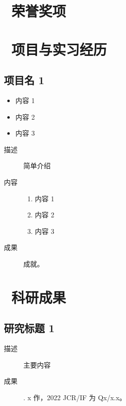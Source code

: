 \documentclass[]{resume}
\begin{document}
\section{\faAward \, 荣誉奖项}


\section{\faCode \, 项目与实习经历}

\subsection{项目名 1}

\begin{itemize}
    \item 内容 1
    \item 内容 2
    \item 内容 3
\end{itemize}


\begin{description}
    \item[描述] 简单介绍
    \item[内容]
        \begin{enumerate}
            \item 内容 1
            \item 内容 2
            \item 内容 3
        \end{enumerate}
    \item[成果] 成就。
\end{description}

\section{\aiGoogleScholar \, 科研成果}

\subsection{研究标题 1}

\begin{description}
    \item[描述] 主要内容
    \item[成果] . x 作，2022 JCR/IF 为 Qx/x.x。
\end{description}
\end{document}
